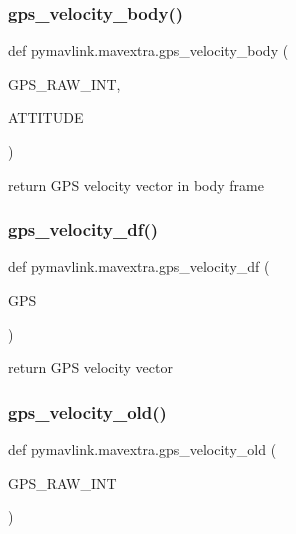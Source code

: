 \subsubsection{\texorpdfstring{gps\+\_\+velocity\+\_\+body()}{gps\_velocity\_body()}}
{\footnotesize\ttfamily def pymavlink.\+mavextra.\+gps\+\_\+velocity\+\_\+body (\begin{DoxyParamCaption}\item[{}]{G\+P\+S\+\_\+\+R\+A\+W\+\_\+\+I\+NT,  }\item[{}]{A\+T\+T\+I\+T\+U\+DE }\end{DoxyParamCaption})}

\begin{DoxyVerb}return GPS velocity vector in body frame\end{DoxyVerb}
 \mbox{\label{namespacepymavlink_1_1mavextra_a283e68b9dcd503bfedb6431c4815660c}} 
\subsubsection{\texorpdfstring{gps\+\_\+velocity\+\_\+df()}{gps\_velocity\_df()}}
{\footnotesize\ttfamily def pymavlink.\+mavextra.\+gps\+\_\+velocity\+\_\+df (\begin{DoxyParamCaption}\item[{}]{G\+PS }\end{DoxyParamCaption})}

\begin{DoxyVerb}return GPS velocity vector\end{DoxyVerb}
 \mbox{\label{namespacepymavlink_1_1mavextra_aee56305fd91e4db7b5b0a35725659c1c}} 
\subsubsection{\texorpdfstring{gps\+\_\+velocity\+\_\+old()}{gps\_velocity\_old()}}
{\footnotesize\ttfamily def pymavlink.\+mavextra.\+gps\+\_\+velocity\+\_\+old (\begin{DoxyParamCaption}\item[{}]{G\+P\+S\+\_\+\+R\+A\+W\+\_\+\+I\+NT }\end{DoxyParamCaption})}


